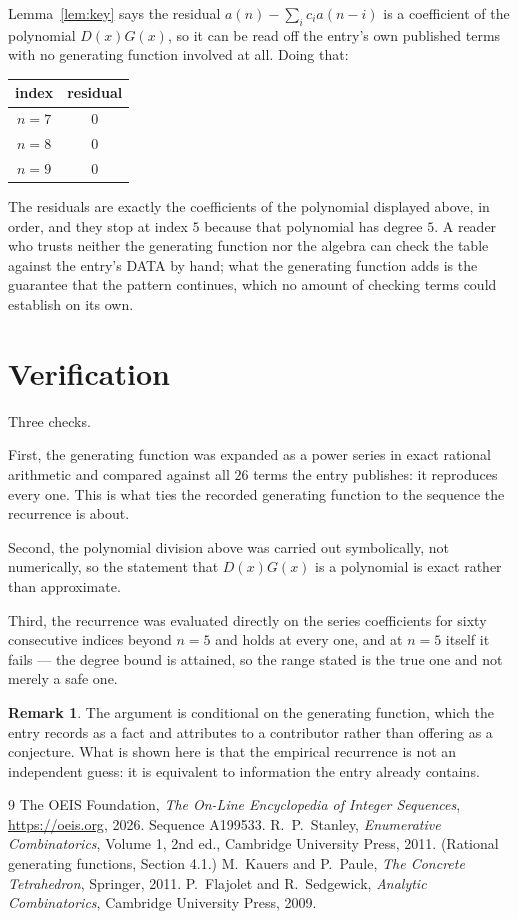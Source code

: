 \documentclass[11pt,a4paper]{article}
\theoremstyle{plain}
\theoremstyle{definition}
\newtheorem{remark}[theorem]{Remark}
\begin{document}
Lemma~\ref{lem:key} says the residual $a(n)-\sum_ic_ia(n-i)$ is a coefficient of the
polynomial $D(x)G(x)$, so it can be read off the entry's own published terms with no
generating function involved at all. Doing that:
\begin{center}
\begin{tabular}{cc}
index & residual \\ \hline
$n=7$ & $0$ \\
$n=8$ & $0$ \\
$n=9$ & $0$
\end{tabular}
\end{center}
The residuals are exactly the coefficients of the polynomial displayed above, in order, and
they stop at index $5$ because that polynomial has degree $5$. A reader who trusts
neither the generating function nor the algebra can check the table against the entry's DATA
by hand; what the generating function adds is the guarantee that the pattern continues, which
no amount of checking terms could establish on its own.

\section{Verification}

Three checks.

First, the generating function was expanded as a power series in exact rational arithmetic and
compared against all $26$ terms the entry publishes: it reproduces every one. This is
what ties the recorded generating function to the sequence the recurrence is about.

Second, the polynomial division above was carried out symbolically, not numerically, so the
statement that $D(x)G(x)$ is a polynomial is exact rather than approximate.

Third, the recurrence was evaluated directly on the series coefficients for sixty consecutive
indices beyond $n=5$ and holds at every one, and at $n=5$ itself it fails --- the
degree bound is attained, so the range stated is the true one and not merely a safe one.

\begin{remark}
The argument is conditional on the generating function, which the entry records as a fact and
attributes to a contributor rather than offering as a conjecture. What is shown here is that
the empirical recurrence is not an independent guess: it is equivalent to information the
entry already contains.
\end{remark}

\begin{thebibliography}{9}
 The OEIS Foundation, \emph{The On-Line Encyclopedia of Integer
Sequences}, \url{https://oeis.org}, 2026. Sequence A199533.
 R.~P.~Stanley, \emph{Enumerative Combinatorics}, Volume 1, 2nd ed.,
Cambridge University Press, 2011. (Rational generating functions, Section 4.1.)
 M.~Kauers and P.~Paule, \emph{The Concrete Tetrahedron}, Springer, 2011.
 P.~Flajolet and R.~Sedgewick, \emph{Analytic Combinatorics}, Cambridge
University Press, 2009.
\end{thebibliography}
\end{document}
